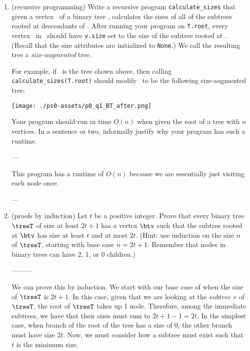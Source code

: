 \documentclass[11pt]{article}
\begin{document}
\begin{enumerate}
 \begin{enumerate}
 \item \label{part:calculatesizes} (recursive programming)
 Write a recursive program \texttt{calculate\_sizes} that given a vertex \btv\ of a binary tree \treeT, calculates the sizes of all of the subtrees rooted at descendants of \btv.  After running your program on \texttt{T.root}, every vertex \btv\ in \treeT\ should have \texttt{v.size} set to the size of the subtree rooted at \btv. (Recall that the size attributes are initialized to \texttt{None}.)  We call the resulting tree a {\em size-augmented} tree.
 
For example, if \treeT\  is the  tree shown above, 
then calling \texttt{calculate\_sizes(T.root)} should modify  \treeT\ to be the following size-augmented tree:

 \texttt{[image: ./ps0-assets/p0\_q1\_BT\_after.png]}

 Your program should run in time $O(n)$ when given the root of a tree with $n$ vertices. In a sentence or two, informally justify why your program has such a runtime. 

 \smallskip
 ---

 This program has a runtime of $O(n)$ because we are essentially just visiting each node once.
 
 --- 
 \smallskip


    \item (proofs by induction) Let $t$ be a positive integer. Prove that every binary tree $\treeT$ of size at least $2t+1$ has a vertex $\btv$ such that the subtree rooted at $\btv$ has size at least $t$ and at most $2t$.  (Hint: use induction on the size $n$ of $\treeT$, starting with base case $n=2t+1$.  Remember that nodes in binary trees can have 2, 1, or 0 children.) \label{part:induction-tsize}

    \smallskip

    ---------
    
    We can prove this by induction. We start with our base case of when the size of $\treeT$ is $2t + 1$. In this case, given that we are looking at the $\textit{subtree}$ $v$ of $\treeT$, the root of $\treeT$ takes up 1 node. Therefore, among the immediate subtrees, we have that their sizes must sum to $2t + 1 - 1 = 2t$.
    In the simplest case, when branch of the root of the tree has a size of 0, the other branch must have size $2t$. Now, we must consider how a subtree must exist such that $t$ is the minimum size.
    


\end{enumerate}
\end{enumerate}
\end{document}
